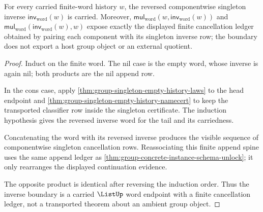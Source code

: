 \begin{theorem}
\label{thm:group-finite-word-inverse-boundary}
For every carried finite-word history $w$, the reversed componentwise singleton
inverse $\mathsf{inv}_{\mathrm{word}}(w)$ is carried. Moreover,
$\mathsf{mul}_{\mathrm{word}}(w,\mathsf{inv}_{\mathrm{word}}(w))$ and
$\mathsf{mul}_{\mathrm{word}}(\mathsf{inv}_{\mathrm{word}}(w),w)$ expose exactly
the displayed finite cancellation ledger obtained by pairing each component
with its singleton inverse row; the boundary does not export a host group
object or an external quotient.
\end{theorem}
\begin{proof}
Induct on the finite word. The nil case is the empty word, whose inverse is
again nil; both products are the nil append row.

In the cons case, apply
\autoref{thm:group-singleton-empty-history-laws} to the head endpoint and
\autoref{thm:group-singleton-empty-history-namecert} to keep the transported
classifier row inside the singleton certificate. The induction hypothesis gives
the reversed inverse word for the tail and its carriedness.

Concatenating the word with its reversed inverse produces the visible sequence
of componentwise singleton cancellation rows. Reassociating this finite append
spine uses the same append ledger as
\autoref{thm:group-concrete-instance-schema-unlock}; it only rearranges the
displayed continuation evidence.

The opposite product is identical after reversing the induction order. Thus the
inverse boundary is a carried $\ListUp$ word endpoint with a finite cancellation
ledger, not a transported theorem about an ambient group object.
\end{proof}

